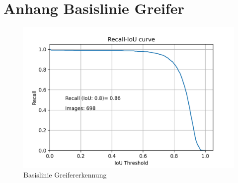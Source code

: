 \chapter{Anhang Basislinie Greifer}
\label{appendix:BasislinieGrapple}


\begin{figure}[h]
	\centering
	\includegraphics[width=1\textwidth, center]{bilder/Anhang/Baseline/Grapple/RecallIoU_Validation.png}
	\caption[RecallIoUGrappleBaseline]{Basislinie Greifererkennung}
	\label{img:RecallIoUGrappleBaseline}
\end{figure}	
